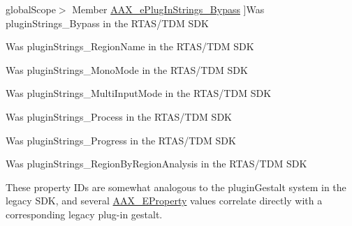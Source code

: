 \begin{DoxyRefList}
\hypertarget{a00385__porting_notes000020}{}%
global\+Scope$>$ Member \hyperlink{a00206_a86f7310877399d9d4d2ea4863d472476a9b49eb0306daf949d9bf4a5d4b22ada0}{A\+A\+X\+\_\+e\+Plug\+In\+Strings\+\_\+\+Bypass} ]Was plugin\+Strings\+\_\+\+Bypass in the R\+T\+A\+S/\+T\+D\+M S\+D\+K  
\item[\label{a00385__porting_notes000017}%
\hypertarget{a00385__porting_notes000017}{}%
global\+Scope$>$ Member \hyperlink{a00206_a86f7310877399d9d4d2ea4863d472476ab33b745bc2c47f9c95bad0125ff6c816}{A\+A\+X\+\_\+e\+Plug\+In\+Strings\+\_\+\+Clip\+Name} ]Was plugin\+Strings\+\_\+\+Region\+Name in the R\+T\+A\+S/\+T\+D\+M S\+D\+K  
\item[\label{a00385__porting_notes000013}%
\hypertarget{a00385__porting_notes000013}{}%
global\+Scope$>$ Member \hyperlink{a00206_a86f7310877399d9d4d2ea4863d472476ace28c7a0863e1adef165d0f3b52a9660}{A\+A\+X\+\_\+e\+Plug\+In\+Strings\+\_\+\+Mono\+Mode} ]Was plugin\+Strings\+\_\+\+Mono\+Mode in the R\+T\+A\+S/\+T\+D\+M S\+D\+K  
\item[\label{a00385__porting_notes000014}%
\hypertarget{a00385__porting_notes000014}{}%
global\+Scope$>$ Member \hyperlink{a00206_a86f7310877399d9d4d2ea4863d472476a4e05ed47ae75ef3c99ed7b5599da6e53}{A\+A\+X\+\_\+e\+Plug\+In\+Strings\+\_\+\+Multi\+Input\+Mode} ]Was plugin\+Strings\+\_\+\+Multi\+Input\+Mode in the R\+T\+A\+S/\+T\+D\+M S\+D\+K  
\item[\label{a00385__porting_notes000019}%
\hypertarget{a00385__porting_notes000019}{}%
global\+Scope$>$ Member \hyperlink{a00206_a86f7310877399d9d4d2ea4863d472476a28ef93b11664703ce99624d99b2d163c}{A\+A\+X\+\_\+e\+Plug\+In\+Strings\+\_\+\+Process} ]Was plugin\+Strings\+\_\+\+Process in the R\+T\+A\+S/\+T\+D\+M S\+D\+K  
\item[\label{a00385__porting_notes000018}%
\hypertarget{a00385__porting_notes000018}{}%
global\+Scope$>$ Member \hyperlink{a00206_a86f7310877399d9d4d2ea4863d472476a2524774deef9e82058134126dc729a5a}{A\+A\+X\+\_\+e\+Plug\+In\+Strings\+\_\+\+Progress} ]Was plugin\+Strings\+\_\+\+Progress in the R\+T\+A\+S/\+T\+D\+M S\+D\+K  
\item[\label{a00385__porting_notes000015}%
\hypertarget{a00385__porting_notes000015}{}%
global\+Scope$>$ Member \hyperlink{a00206_a86f7310877399d9d4d2ea4863d472476ae3a832bfc597a707358610647b3f51c3}{A\+A\+X\+\_\+e\+Plug\+In\+Strings\+\_\+\+Region\+By\+Region\+Analysis} ]Was plugin\+Strings\+\_\+\+Region\+By\+Region\+Analysis in the R\+T\+A\+S/\+T\+D\+M S\+D\+K  
\item[\label{a00385__porting_notes000039}%
\hypertarget{a00385__porting_notes000039}{}%
global\+Scope$>$ Member \hyperlink{a00283_a6571f4e41a5dd06e4067249228e2249e}{A\+A\+X\+\_\+\+E\+Property} ]These property I\+Ds are somewhat analogous to the plugin\+Gestalt system in the legacy S\+D\+K, and several \hyperlink{a00283_a6571f4e41a5dd06e4067249228e2249e}{A\+A\+X\+\_\+\+E\+Property} values correlate directly with a corresponding legacy plug-\/in gestalt.


\end{DoxyRefList}

